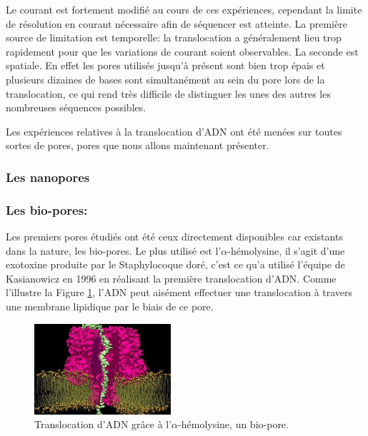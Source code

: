 \documentclass[a4paper,11pt]{article}
\begin{document}
Le courant est fortement modifié au cours de ces expériences, cependant la limite de résolution en courant nécessaire afin de séquencer est atteinte. La première source de limitation est temporelle: la translocation a généralement lieu trop rapidement pour que les variations de courant soient observables. La seconde est spatiale. En effet les pores utilisés jusqu'à présent sont bien trop épais et plusieurs dizaines de bases sont simultanément au sein du pore lors de la translocation, ce qui rend très difficile de distinguer les unes des autres les nombreuses séquences possibles.

Les expériences relatives à la translocation d'ADN ont été menées sur toutes sortes de pores, pores que nous allons maintenant présenter.
 
 

\subsubsection{Les nanopores}



\subsubsection*{Les bio-pores:}
Les premiers pores étudiés ont été ceux directement disponibles car existants dans la nature, les bio-pores. Le plus utilisé est l'$\alpha$-hémolysine, il s'agit d'une exotoxine produite par le Staphylocoque doré, c'est ce qu'a utilisé l'équipe de Kasianowicz \cite{kasianowicz1996} en 1996 en réalisant la première translocation d'ADN. Comme l'illustre la Figure \ref{biopore}, l'ADN peut aisément effectuer une translocation à travers une membrane lipidique par le biais de ce pore. \\

\begin{figure}[H]
\begin{center}
\includegraphics[width=0.45\textwidth]{biopore.jpg}

\caption{Translocation d'ADN grâce à l'$\alpha$-hémolysine, un bio-pore.}
\label{biopore}
\end{center}
\end{figure}
\end{document}
